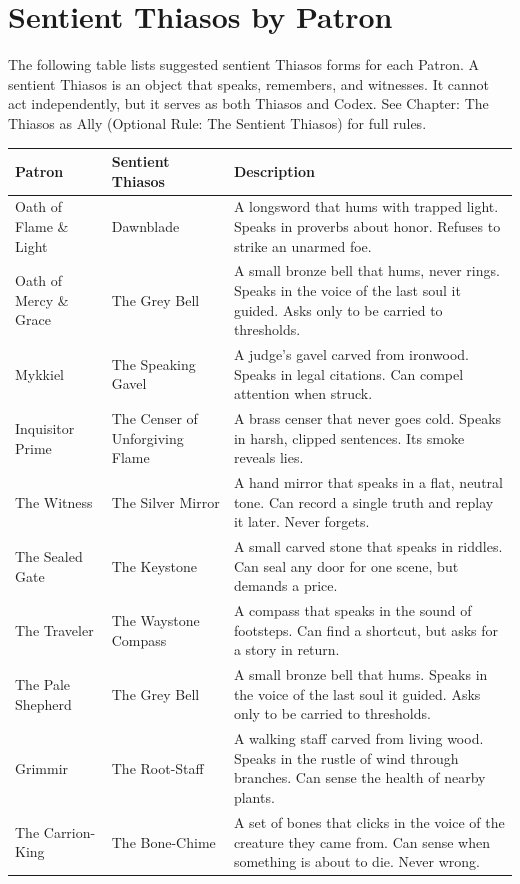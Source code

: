\section{Sentient Thiasos by Patron}

The following table lists suggested sentient Thiasos forms for each Patron. A sentient Thiasos is an object that speaks, remembers, and witnesses. It cannot act independently, but it serves as both Thiasos and Codex. See Chapter: The Thiasos as Ally (Optional Rule: The Sentient Thiasos) for full rules.

\begin{table}[h]
\centering
\small
\begin{tabular}{lll}
\hline
\textbf{Patron} & \textbf{Sentient Thiasos} & \textbf{Description} \\
\hline
Oath of Flame \& Light & Dawnblade & A longsword that hums with trapped light. Speaks in proverbs about honor. Refuses to strike an unarmed foe. \\
Oath of Mercy \& Grace & The Grey Bell & A small bronze bell that hums, never rings. Speaks in the voice of the last soul it guided. Asks only to be carried to thresholds. \\
Mykkiel & The Speaking Gavel & A judge's gavel carved from ironwood. Speaks in legal citations. Can compel attention when struck. \\
Inquisitor Prime & The Censer of Unforgiving Flame & A brass censer that never goes cold. Speaks in harsh, clipped sentences. Its smoke reveals lies. \\
The Witness & The Silver Mirror & A hand mirror that speaks in a flat, neutral tone. Can record a single truth and replay it later. Never forgets. \\
\hline
The Sealed Gate & The Keystone & A small carved stone that speaks in riddles. Can seal any door for one scene, but demands a price. \\
The Traveler & The Waystone Compass & A compass that speaks in the sound of footsteps. Can find a shortcut, but asks for a story in return. \\
The Pale Shepherd & The Grey Bell & A small bronze bell that hums. Speaks in the voice of the last soul it guided. Asks only to be carried to thresholds. \\
\hline
Grimmir & The Root-Staff & A walking staff carved from living wood. Speaks in the rustle of wind through branches. Can sense the health of nearby plants. \\
The Carrion-King & The Bone-Chime & A set of bones that clicks in the voice of the creature they came from. Can sense when something is about to die. Never wrong. \\

\end{tabular}
\end{table}
